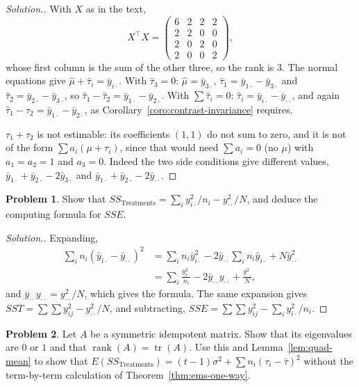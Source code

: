 \documentclass[11pt,a4paper]{article}
\numberwithin{equation}{section}
\theoremstyle{definition}
\newtheorem{problemx}{Problem}[subsection]
\newenvironment{problem}{\begin{problemx}}{\end{problemx}}
\newenvironment{solution}
  {\renewcommand{\qedsymbol}{}\begin{proof}[\textit{Solution}.]}
  {\end{proof}}
\begin{document}
\begin{solution}
With $X$ as in the text,
\[
X^\top X = \begin{pmatrix} 6 & 2 & 2 & 2 \\ 2 & 2 & 0 & 0 \\ 2 & 0 & 2 & 0 \\ 2 & 0 & 0 & 2 \end{pmatrix} ,
\]
whose first column is the sum of the other three, so the rank is $3$. The normal equations give $\hat\mu + \hat\tau_i = \bar y_{i\cdot}$. With $\hat\tau_3 = 0$: $\hat\mu = \bar y_{3\cdot}$,
$\hat\tau_1 = \bar y_{1\cdot} - \bar y_{3\cdot}$ and $\hat\tau_2 = \bar y_{2\cdot} - \bar y_{3\cdot}$, so $\hat\tau_1 - \hat\tau_2 = \bar y_{1\cdot} - \bar y_{2\cdot}$. With $\sum\hat\tau_i = 0$: $\hat\tau_i = \bar y_{i\cdot} - \bar y_{\cdot\cdot}$, and again
$\hat\tau_1 - \hat\tau_2 = \bar y_{1\cdot} - \bar y_{2\cdot}$, as Corollary~\ref{coro:contrast-invariance} requires.

$\tau_1 + \tau_2$ is not estimable: its coefficients $(1, 1)$ do not sum to zero, and it is not of the form $\sum a_i(\mu + \tau_i)$, since that would need $\sum a_i = 0$ (no $\mu$) with
$a_1 = a_2 = 1$ and $a_3 = 0$. Indeed the two side conditions give different values, $\bar y_{1\cdot} + \bar y_{2\cdot} - 2\bar y_{3\cdot}$ and $\bar y_{1\cdot} + \bar y_{2\cdot} - 2\bar y_{\cdot\cdot}$.
\end{solution}

\begin{problem}
Show that $SS_{\mathrm{Treatments}} = \sum_iy_{i\cdot}^2/n_i - y_{\cdot\cdot}^2/N$, and deduce the computing formula for $SSE$.
\end{problem}

\begin{solution}
Expanding,
\begin{align*}
\sum_in_i(\bar y_{i\cdot} - \bar y_{\cdot\cdot})^2 &= \sum_in_i\bar y_{i\cdot}^2 - 2\bar y_{\cdot\cdot}\sum_in_i\bar y_{i\cdot} + N\bar y_{\cdot\cdot}^2 \\
&= \sum_i\frac{y_{i\cdot}^2}{n_i} - 2\bar y_{\cdot\cdot}y_{\cdot\cdot} + \frac{y_{\cdot\cdot}^2}{N} ,
\end{align*}
and $\bar y_{\cdot\cdot}y_{\cdot\cdot} = y_{\cdot\cdot}^2/N$, which gives the formula. The same expansion gives $SST = \sum\sum y_{ij}^2 - y_{\cdot\cdot}^2/N$, and subtracting,
$SSE = \sum\sum y_{ij}^2 - \sum_iy_{i\cdot}^2/n_i$.
\end{solution}

\begin{problem}
Let $A$ be a symmetric idempotent matrix. Show that its eigenvalues are $0$ or $1$ and that $\operatorname{rank}(A) = \operatorname{tr}(A)$. Use this and Lemma~\ref{lem:quad-mean} to
show that $E(SS_{\mathrm{Treatments}}) = (t - 1)\sigma^2 + \sum n_i(\tau_i - \bar\tau)^2$ without the term-by-term calculation of Theorem~\ref{thm:ems-one-way}.
\end{problem}
\end{document}
